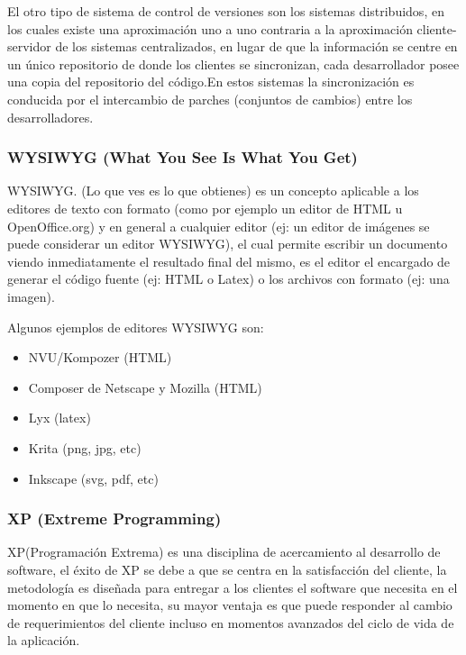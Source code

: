 El otro tipo de sistema de control de versiones son los sistemas distribuidos, en los cuales existe una aproximación uno a uno contraria a la aproximación cliente-servidor de los sistemas centralizados, en lugar de que la información se centre en un único repositorio de donde los clientes se sincronizan, cada desarrollador posee una copia del repositorio del código.\newline En estos sistemas la sincronización es conducida por el intercambio de parches (conjuntos de cambios) entre los desarrolladores.

\subsubsection*{WYSIWYG (What You See Is What You Get)}

WYSIWYG. (Lo que ves es lo que obtienes) es un concepto aplicable a los editores de texto con formato (como por ejemplo un editor de HTML u OpenOffice.org) y en general a cualquier editor (ej: un editor de imágenes se puede considerar un editor WYSIWYG), el cual permite escribir un documento viendo inmediatamente el resultado final del mismo, es el editor el encargado de generar el código fuente (ej: HTML o Latex) o los archivos con formato (ej: una imagen).

Algunos ejemplos de editores WYSIWYG son:

\begin{itemize}

	\item NVU/Kompozer (HTML)
	\item Composer de Netscape y Mozilla (HTML)
	\item Lyx (latex)
	\item Krita (png, jpg, etc)
	\item Inkscape (svg, pdf, etc)

\end{itemize}


\subsubsection*{XP (Extreme Programming) \cite{xp} }

XP(Programación Extrema) es una disciplina de acercamiento al desarrollo de software, el éxito de XP se debe a que se centra en la satisfacción del cliente, la metodología es diseñada para entregar a los clientes el software que necesita en el momento en que lo necesita, su mayor ventaja es que puede responder al cambio de requerimientos del cliente incluso en momentos avanzados del ciclo de vida de la aplicación.

